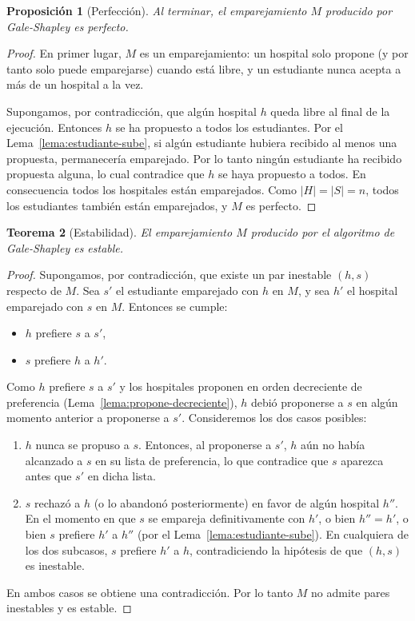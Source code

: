 \documentclass[12pt, spanish, oneside, openany]{book}
\theoremstyle{uprightplain}
\newtheorem{teorema}{Teorema}[section]
\newtheorem{proposicion}[teorema]{Proposición}
\theoremstyle{definition}
\theoremstyle{remark}
\theoremstyle{definition}
\begin{document}
\begin{proposicion}[Perfección]
\label{prop:perfeccion}
Al terminar, el emparejamiento $M$ producido por Gale-Shapley es perfecto.
\end{proposicion}
\begin{proof}
En primer lugar, $M$ es un emparejamiento: un hospital solo propone (y por tanto solo puede emparejarse) cuando está libre, y un estudiante nunca acepta a más de un hospital a la vez.

Supongamos, por contradicción, que algún hospital $h$ queda libre al final de la ejecución. Entonces $h$ se ha propuesto a todos los estudiantes. Por el Lema~\ref{lema:estudiante-sube}, si algún estudiante hubiera recibido al menos una propuesta, permanecería emparejado. Por lo tanto ningún estudiante ha recibido propuesta alguna, lo cual contradice que $h$ se haya propuesto a todos. En consecuencia todos los hospitales están emparejados. Como $|H|=|S|=n$, todos los estudiantes también están emparejados, y $M$ es perfecto.
\end{proof}

\begin{teorema}[Estabilidad]
\label{thm:estabilidad}
El emparejamiento $M$ producido por el algoritmo de Gale-Shapley es estable.
\end{teorema}
\begin{proof}
Supongamos, por contradicción, que existe un par inestable $(h,s)$ respecto de $M$. Sea $s'$ el estudiante emparejado con $h$ en $M$, y sea $h'$ el hospital emparejado con $s$ en $M$. Entonces se cumple:
\begin{itemize}
    \item $h$ prefiere $s$ a $s'$,
    \item $s$ prefiere $h$ a $h'$.
\end{itemize}
Como $h$ prefiere $s$ a $s'$ y los hospitales proponen en orden decreciente de preferencia (Lema~\ref{lema:propone-decreciente}), $h$ debió proponerse a $s$ en algún momento anterior a proponerse a $s'$. Consideremos los dos casos posibles:

\begin{enumerate}
    \item $h$ nunca se propuso a $s$. Entonces, al proponerse a $s'$, $h$ aún no había alcanzado a $s$ en su lista de preferencia, lo que contradice que $s$ aparezca antes que $s'$ en dicha lista.
    \item $s$ rechazó a $h$ (o lo abandonó posteriormente) en favor de algún hospital $h''$. En el momento en que $s$ se empareja definitivamente con $h'$, o bien $h''=h'$, o bien $s$ prefiere $h'$ a $h''$ (por el Lema~\ref{lema:estudiante-sube}). En cualquiera de los dos subcasos, $s$ prefiere $h'$ a $h$, contradiciendo la hipótesis de que $(h,s)$ es inestable.
\end{enumerate}
En ambos casos se obtiene una contradicción. Por lo tanto $M$ no admite pares inestables y es estable.
\end{proof}
\end{document}
